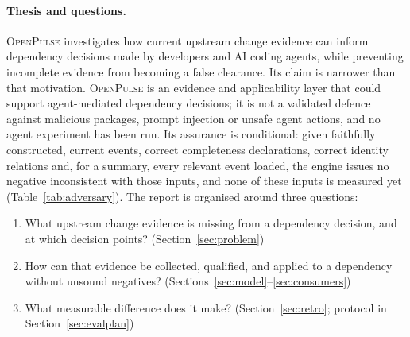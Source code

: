 \documentclass[11pt,a4paper]{article}
\newcommand{\op}{\textsc{OpenPulse}}
\begin{document}
\paragraph{Thesis and questions.} \op{} investigates how current
upstream change evidence can inform dependency decisions made by
developers and AI coding agents, while preventing incomplete evidence
from becoming a false clearance. Its claim is narrower than that
motivation. \op{} is an evidence and applicability layer that could
support agent-mediated dependency decisions; it is not a validated
defence against malicious packages, prompt injection or unsafe agent
actions, and no agent experiment has been run. Its assurance is
conditional: given faithfully constructed, current events, correct
completeness declarations, correct identity relations and, for a
summary, every relevant event loaded, the engine issues no negative
inconsistent with those inputs, and none of these inputs is measured
yet (Table~\ref{tab:adversary}). The report is organised around three
questions:
\begin{enumerate}[leftmargin=*,label=Q\arabic*.]
  \item What upstream change evidence is missing from a dependency
    decision, and at which decision points? (Section~\ref{sec:problem})
  \item How can that evidence be collected, qualified, and applied to
    a dependency without unsound negatives?
    (Sections~\ref{sec:model}--\ref{sec:consumers})
  \item What measurable difference does it make?
    (Section~\ref{sec:retro}; protocol in Section~\ref{sec:evalplan})
\end{enumerate}
\end{document}
